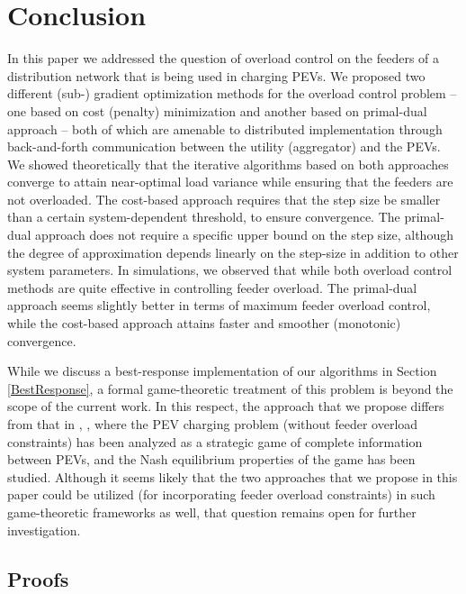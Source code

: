 \documentclass[12pt,draftcls,onecolumn]{IEEEtran}
\begin{document}
\section{Conclusion} \label{sec:concl}
\indent In this paper we addressed the question of overload control on the feeders of a distribution network that is being used in charging PEVs. We proposed two different (sub-) gradient optimization methods for the overload control problem -- one based on cost (penalty) minimization and another based on primal-dual approach -- both of which are amenable to distributed implementation through back-and-forth communication between the utility (aggregator) and the PEVs. We showed theoretically that the iterative algorithms based on both approaches converge to attain near-optimal load variance while ensuring that the feeders are not overloaded. 
The cost-based approach requires that the step size be smaller than a certain system-dependent threshold, to ensure convergence. The primal-dual approach does not require a specific upper bound on the step size, although the degree of approximation depends linearly on the step-size in addition to other system parameters. In simulations, we observed that while both overload control methods are quite effective in controlling feeder overload. The primal-dual approach seems slightly better in terms of maximum feeder overload control, while the cost-based approach attains faster and smoother (monotonic) convergence.

While we discuss a best-response implementation of our algorithms in Section \ref{BestResponse}, a formal game-theoretic treatment of this problem is beyond the scope of the current work. In this respect, the approach that we propose differs from that in \cite{MCH10}, \cite{GKBG13}, where the PEV charging problem (without feeder overload constraints) has been analyzed as a strategic game of complete information between PEVs, and the Nash equilibrium properties of the game has been studied. Although it seems likely that the two approaches that we propose in this paper could be utilized (for incorporating feeder overload constraints) in such game-theoretic frameworks as well, that question remains open for further investigation.




\appendix
\renewcommand{\thesection}{\arabic{section}}
\subsection{Proofs}
\end{document}
